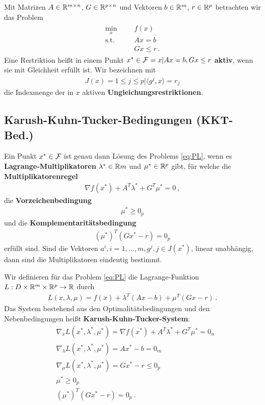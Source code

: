 Mit Matrizen $A \in \mathbb R^{m\times n}$, $G \in \mathbb R^{p\times n}$ und Vektoren $b \in \mathbb R^m$, $r \in \mathbb R^p$ betrachten wir das Problem
	\begin{gather*}
	\label{eq:PL}
  		\tag{PL}
  			\begin{aligned}
    			\min_x
    			& & & f(x) \\
    			\text{s.t.}
    			& & & Ax=b \\
    			& & & Gx \leq r    			\,.
  			\end{aligned}
	\end{gather*}
Eine Restriktion heißt in einem Punkt $x^* \in \mathcal{F} = {x | Ax = b, Gx  \leq r}$ \textbf{aktiv}, wenn sie mit Gleichheit erfüllt ist. Wir bezeichnen mit
\begin{align*}
J(x) = {1  \leq j  \leq p | \langle g^j , x \rangle = r_j}
\end{align*} 	
die Indexmenge der in $x$ aktiven \textbf{Ungleichungsrestriktionen}.

\subsection{Karush-Kuhn-Tucker-Bedingungen (KKT-Bed.)}

Ein Punkt $x^* \in \mathcal{F}$ ist genau dann Lösung des Problems \eqref{eq:PL}, wenn es
\textbf{Lagrange-Multiplikatoren} $\lambda ^* \in \mathbb R m$ und $\mu^* \in \mathbb R^p$ gibt, für welche die
\textbf{Multiplikatorenregel}
\begin{align*}
\nabla f(x^* ) + A^T \lambda^* + G^T \mu^* = 0 \,,
\end{align*}
die \textbf{Vorzeichenbedingung}
\begin{align*}
\mu^* \geq 0_p
\end{align*}
und die \textbf{Komplementaritätsbedingung}
\begin{align*}
(\mu^*)^T (Gx^* - r) = 0_p
\end{align*}
erfüllt sind. Sind die Vektoren $a^i , i = 1, . . . , m, g^j , j \in J(x^*)$, linear unabhängig, dann sind die Multiplikatoren eindeutig bestimmt.

Wir definieren für das Problem \eqref{eq:PL} die Lagrange-Funktion $L : D \times \mathbb R^m \times \mathbb R^p \rightarrow \mathbb R$ durch
\begin{align*}
L(x, \lambda, \mu) = f(x) + \lambda^T(Ax - b) + \mu^T(Gx - r)\,.
\end{align*}
Das System bestehend aus den Optimalitätsbedingungen und den Nebenbedingungen heißt \textbf{Karush-Kuhn-Tucker-System}:
\begin{align*}
&\nabla_x L(x^* , \lambda ^* , \mu ^* ) = \nabla f(x^*) + A^T\lambda ^* + G^T \mu ^* = 0_n \\
&\nabla_\lambda L(x^*, \lambda ^*, \mu ^*) = Ax^* - b = 0_m \\
&\nabla_\mu L(x^* , \lambda ^* , \mu ^* ) = Gx^* - r  \leq 0_p \\
&\mu^* \geq 0_p \\
&(\mu^*)^T (Gx^* - r) = 0_p\,.
\end{align*}


